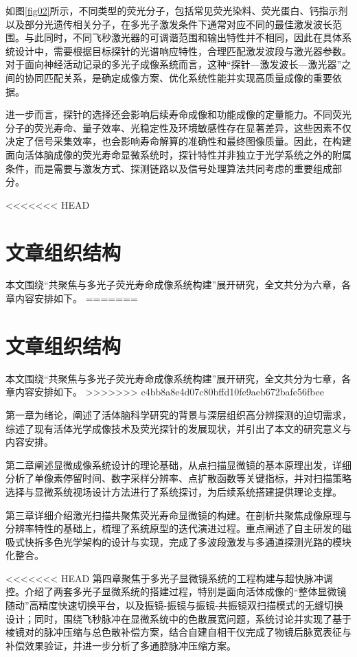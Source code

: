 如图\ref{fig02}所示，不同类型的荧光分子，包括常见荧光染料、荧光蛋白、钙指示剂以及部分光遗传相关分子，在多光子激发条件下通常对应不同的最佳激发波长范围。与此同时，不同飞秒激光器的可调谐范围和输出特性并不相同，因此在具体系统设计中，需要根据目标探针的光谱响应特性，合理匹配激发波段与激光器参数。对于面向神经活动记录的多光子成像系统而言，这种``探针—激发波长—激光器''之间的协同匹配关系，是确定成像方案、优化系统性能并实现高质量成像的重要依据。

进一步而言，探针的选择还会影响后续寿命成像和功能成像的定量能力。不同荧光分子的荧光寿命、量子效率、光稳定性及环境敏感性存在显著差异，这些因素不仅决定了信号采集效率，也会影响寿命解算的准确性和最终图像质量。因此，在构建面向活体脑成像的荧光寿命显微系统时，探针特性并非独立于光学系统之外的附属条件，而是需要与激发方式、探测链路以及信号处理算法共同考虑的重要组成部分。


<<<<<<< HEAD
\section{文章组织结构}\label{1.3}
本文围绕``共聚焦与多光子荧光寿命成像系统构建''展开研究，全文共分为六章，各章内容安排如下。
=======

\section{文章组织结构}\label{1.3}
本文围绕``共聚焦与多光子荧光寿命成像系统构建''展开研究，全文共分为七章，各章内容安排如下。
>>>>>>> c4bb8a8e4d07c80bffd10fe9aeb672bafe56fbee

第一章为绪论，阐述了活体脑科学研究的背景与深层组织高分辨探测的迫切需求，综述了现有活体光学成像技术及荧光探针的发展现状，并引出了本文的研究意义与内容安排。

第二章阐述显微成像系统设计的理论基础，从点扫描显微镜的基本原理出发，详细分析了单像素停留时间、数字采样分辨率、点扩散函数等关键指标，并对扫描策略选择与显微系统视场设计方法进行了系统探讨，为后续系统搭建提供理论支撑。

第三章详细介绍激光扫描共聚焦荧光寿命显微镜的构建。在剖析共聚焦成像原理与分辨率特性的基础上，梳理了系统原型的迭代演进过程。重点阐述了自主研发的磁吸式快拆多色光学架构的设计与实现，完成了多波段激发与多通道探测光路的模块化整合。

<<<<<<< HEAD
第四章聚焦于多光子显微镜系统的工程构建与超快脉冲调控。介绍了两套多光子显微系统的搭建过程，特别是面向活体成像的``整体显微镜随动''高精度快速切换平台，以及振镜-振镜与振镜-共振镜双扫描模式的无缝切换设计；同时，围绕飞秒脉冲在显微系统中的色散展宽问题，系统讨论并实现了基于棱镜对的脉冲压缩与总色散补偿方案，结合自建自相干仪完成了物镜后脉宽表征与补偿效果验证，并进一步分析了多通腔脉冲压缩方案。

